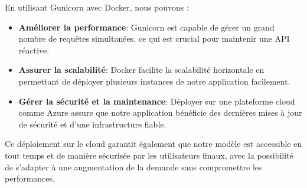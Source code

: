 \documentclass[12pt]{extarticle}
\begin{document}
En utilisant Gunicorn avec Docker, nous pouvons :
\begin{itemize}
    \item \textbf{Améliorer la performance}: Gunicorn est capable de gérer un grand nombre de requêtes simultanées, ce qui est crucial pour maintenir une API réactive.
    \item \textbf{Assurer la scalabilité}: Docker facilite la scalabilité horizontale en permettant de déployer plusieurs instances de notre application facilement.
    \item \textbf{Gérer la sécurité et la maintenance}: Déployer sur une plateforme cloud comme Azure assure que notre application bénéficie des dernières mises à jour de sécurité et d'une infrastructure fiable.
\end{itemize}

Ce déploiement sur le cloud garantit également que notre modèle est accessible en tout temps et de manière sécurisée par les utilisateurs finaux, avec la possibilité de s'adapter à une augmentation de la demande sans compromettre les performances.
\clearpage
\end{document}
